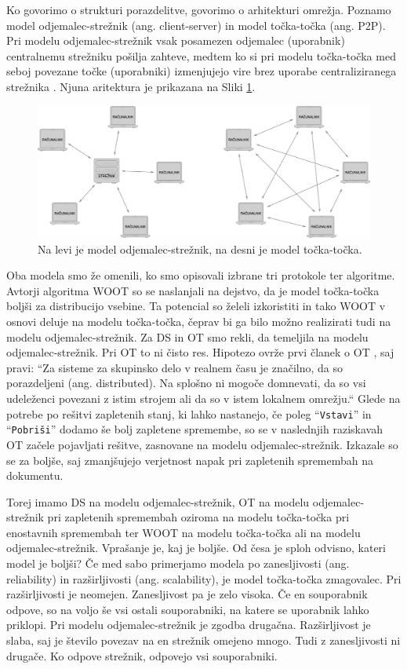 \documentclass[a4paper, 12pt, twoside]{book}
\begin{document}
Ko govorimo o strukturi porazdelitve, govorimo o arhitekturi omrežja. Poznamo model odjemalec-strežnik (ang. client-server) in model točka-točka (ang. P2P). Pri modelu odjemalec-strežnik vsak posamezen odjemalec (uporabnik) centralnemu strežniku pošilja zahteve, medtem ko si pri modelu točka-točka med seboj povezane točke (uporabniki) izmenjujejo vire brez uporabe centraliziranega strežnika \cite{p2p} \cite{c-s}. Njuna aritektura je prikazana na Sliki \ref{p2p_c-s}.

\begin{figure}[placement h]
\begin{center}
\includegraphics[width=13cm]{p2p_c-s.png}
\end{center}
\caption{Na levi je model odjemalec-strežnik, na desni je model točka-točka.}
\label{p2p_c-s}
\end{figure}

Oba modela smo že omenili, ko smo opisovali izbrane tri protokole ter algoritme. Avtorji algoritma WOOT so se naslanjali na dejstvo, da je model točka-točka boljši za distribucijo vsebine. Ta potencial so želeli izkoristiti in tako WOOT v osnovi deluje na modelu točka-točka, čeprav bi ga bilo možno realizirati tudi na modelu odjemalec-strežnik. Za DS in OT smo rekli, da temeljila na modelu odjemalec-strežnik. Pri OT to ni čisto res. Hipotezo ovrže prvi članek o OT \cite{ccigs}, saj pravi: “Za sisteme za skupinsko delo v realnem času je značilno, da so porazdeljeni (ang. distributed). Na splošno ni mogoče domnevati, da so vsi udeleženci povezani z istim strojem ali da so v istem lokalnem omrežju.“ Glede na potrebe po rešitvi zapletenih stanj, ki lahko nastanejo, če poleg “{\tt Vstavi}” in “{\tt Pobriši}” dodamo še bolj zapletene spremembe, so se v naslednjih raziskavah OT \cite{hllbw} začele pojavljati rešitve, zasnovane na modelu odjemalec-strežnik. Izkazale so se za boljše, saj zmanjšujejo verjetnost napak pri zapletenih spremembah na dokumentu.

Torej imamo DS na modelu odjemalec-strežnik, OT na modelu odjemalec-strežnik pri zapletenih spremembah oziroma na modelu točka-točka pri enostavnih spremembah ter WOOT na modelu točka-točka ali na modelu odjemalec-strežnik. Vprašanje je, kaj je boljše. Od česa je sploh odvisno, kateri model je boljši? Če med sabo primerjamo modela po zanesljivosti (ang. reliability) in razširljivosti (ang. scalability), je model točka-točka zmagovalec. Pri razširljivosti je neomejen. Zanesljivost pa je zelo visoka. Če en souporabnik odpove, so na voljo še vsi ostali souporabniki, na katere se uporabnik lahko priklopi. Pri modelu odjemalec-strežnik je zgodba drugačna. Razširljivost je slaba, saj je število povezav na en strežnik omejeno mnogo. Tudi z zanesljivosti ni drugače. Ko odpove strežnik, odpovejo vsi souporabniki.
\end{document}
